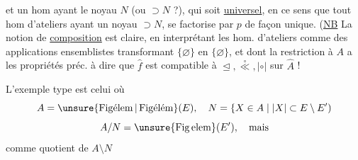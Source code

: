 
et un hom
ayant le noyau $N$ (ou $\supset N$ ?), qui soit \uline{universel}, en ce sens que tout hom d'ateliers
ayant un noyau $\supset N$, se factorise par $p$ de façon unique. (\uline{NB} La notion de \uline{composition} est claire, en interprétant les hom. d'ateliers comme des applications ensemblistes
transformant $\{\varnothing\}$ en $\{\varnothing\}$, et   dont la restriction à $A$ a les propriétés préc.  à dire que $\widehat{f}$ est compatible à $\trianglelefteq,\overset{\circ}{\ll},\mathrel{|\circ|}$ sur $\widehat{A}$ !

L'exemple type est celui où
\[
A=\unsure{\operatorname{Fig\acute{e}lem}|\operatorname{Fig\acute{e}l\acute{e}m}}(E),\quad N=\{X\in A\mid |X|\subset E\setminus E')
\]
\[
A/N=\unsure{\operatorname{Fig\,elem}}(E'),\quad\text{mais}
\]
    comme quotient de $A\setminus N$

